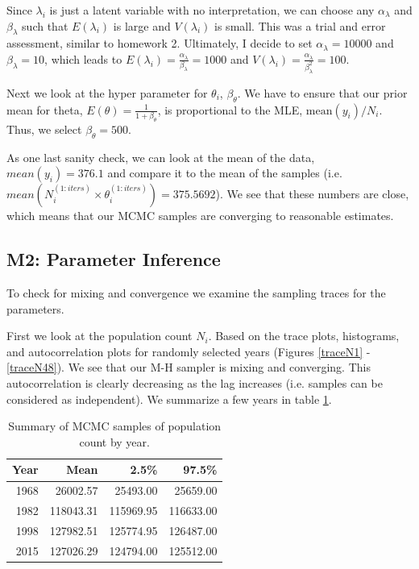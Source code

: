 \documentclass{asaproc}
\newcommand{\yi}{y_i}
\newcommand{\alplam}{\alpha_\lambda}
\newcommand{\betlam}{\beta_\lambda}
\newcommand{\betthet}{\beta_\theta}
\newcommand{\lami}{\lambda_i}
\newcommand{\theti}{\theta_i}
\newcommand{\Ni}{N_i}
\begin{document}
Since $\lami$ is just a latent variable with no interpretation, we can choose any $\alplam$ and $\betlam$ such that $E(\lami)$ is large and $V(\lami)$ is small. This was a trial and error assessment, similar to homework 2. Ultimately, I decide to set $\alplam = 10000$ and $\betlam = 10$, which leads to $E(\lami) = \frac{\alplam}{\betlam} = 1000$ and $V(\lami) = \frac{\alplam}{\betlam^2} = 100$.

Next we look at the hyper parameter for $\theti$, $\betthet$. We have to ensure that our prior mean for theta, $E(\theta) = \frac{1}{1+\betthet}$, is proportional to the MLE, $ \text{mean}(\yi)/\Ni$. Thus, we select $\betthet = 500$. 

As one last sanity check, we can look at the mean of the data, $mean(\yi) = 376.1$ and compare it to the mean of the samples (i.e. $mean(N^{(1:iters)}_{i}\times\theta^{(1:iters)}_{i}) = 375.5692$). We see that these numbers are close, which means that our MCMC samples are converging to reasonable estimates. 

\subsection{M2: Parameter Inference}
To check for mixing and convergence we examine the sampling traces for the parameters. 

First we look at the population count $\Ni$. Based on the trace plots, histograms, and autocorrelation plots for randomly selected years (Figures \ref{traceN1} - \ref{traceN48}). We see that our M-H sampler is mixing and converging.  This autocorrelation is clearly decreasing as the lag increases (i.e. samples can be considered as independent). We summarize a few years in table \ref{Nisummary}. 


\begin{table}[h!]
\centering

\begin{tabular}{rrrr}
  \hline
 Year& Mean & 2.5\% & 97.5\% \\ 
  \hline
1968 & 26002.57 & 25493.00 & 25659.00 \\ 
  1982 & 118043.31 & 115969.95 & 116633.00 \\ 
  1998 & 127982.51 & 125774.95 & 126487.00 \\ 
  2015 & 127026.29 & 124794.00 & 125512.00 \\ 
   \hline
\end{tabular}
\caption{Summary of MCMC samples of population count by year.}
\label{Nisummary}
\end{table}
\end{document}
